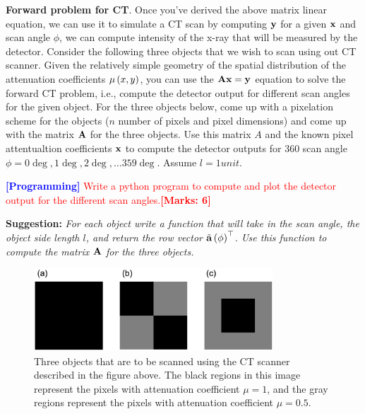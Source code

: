 \documentclass[12pt]{article}
\def\mf{\ensuremath\mathbf}
\def\lp{\ensuremath\left(}
\def\rp{\ensuremath\right)}
\newcommand{\ct}[1]{\lp #1\rp}
\begin{document}
\begin{enumerate}
\textbf{Forward problem for CT}. Once you've derived the above matrix linear equation, we can use it to simulate a CT scan by computing $\mf{y}$ for a given $\mf{x}$ and scan angle $\phi$, we can compute intensity of the x-ray that will be measured by the detector. Consider the following three objects that we wish to scan using out CT scanner. Given the relatively simple geometry of the spatial distribution of the attenuation coefficients $\mu\ct{x,y}$, you can use the $\mf{A}\mf{x} = \mf{y}$ equation to solve the forward CT problem, i.e., compute the detector output for different scan angles for the given object. For the three objects below, come up with a pixelation scheme for the objects ($n$ number of pixels and pixel dimensions) and come up with the matrix $\mf{A}$ for the three objects. Use this matrix $A$ and the known pixel attentualtion coefficients $\mf{x}$ to compute the detector outputs for 360 scan angle $\phi = 0\deg, 1\deg, 2\deg, \ldots 359\deg$. Assume $l = 1 unit$.

\textcolor{red}{\textcolor{blue}{\textbf{[Programming]}} Write a python program to compute and plot the detector output for the different scan angles.\textbf{[Marks: 6]}}

\textbf{Suggestion:} \textit{For each object write a function that will take in the scan angle, the object side length $l$, and return the row vector $\tilde{\mf{a}}\ct{\phi}^\top$. Use this function to compute the matrix $\mf{A}$ for the three objects.}


\begin{figure}[h]
    \centering
    \includegraphics[width = 0.8\textwidth]{ct_images.png}
    \caption{Three objects that are to be scanned using the CT scanner described in the figure above. The black regions in this image represent the pixels with attenuation coefficient $\mu = 1$, and the gray regions represent the pixels with attenuation coefficient $\mu = 0.5$.}
    \label{fig:ctimages}
\end{figure}
\end{enumerate}
\end{document}
